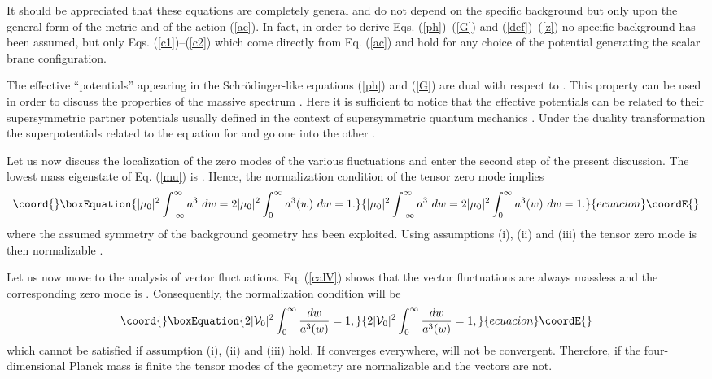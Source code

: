 \documentclass[a4paper,12pt]{article}
\begin{document}
It should be appreciated that these equations are completely general
and do not depend on the specific background but only upon the general
form of the metric and of the action (\ref{ac}). In fact, in order
to derive Eqs. (\ref{ph})--(\ref{G}) and (\ref{def})--(\ref{z}) 
no specific background has been assumed, but only Eqs. (\ref{c1})--(\ref{c2}) 
which come directly from Eq. (\ref{ac}) and hold for any choice of the 
potential generating the scalar brane configuration.

The effective ``potentials'' appearing 
in the Schr\"odinger-like equations (\ref{ph}) and (\ref{G}) are dual 
with respect to \coordHE{}. This property can be used in order to 
discuss the properties of the massive spectrum \cite{n1}. Here 
it is sufficient to notice that the effective potentials can be related 
to their supersymmetric partner potentials \cite{n1} usually 
defined in the context of supersymmetric quantum mechanics \cite{susqm}. 
Under the duality transformation \coordHE{} 
the superpotentials related to the equation for \myHighlight{$\Phi$}\coordHE{} and \coordHE{} 
go one into the other \cite{n1}. 

Let us now discuss the localization of the zero modes of the various 
fluctuations and enter the second step of the present discussion.
The lowest mass eigenstate of Eq. (\ref{mu}) 
is  \coordHE{}. Hence, the normalization 
condition of the tensor zero mode implies 
\begin{equation}\coord{}\boxEquation{
|\mu_0|^2 \int_{-\infty}^{\infty} a^3 ~dw = 2 |\mu_0|^2\int_{0}^{\infty}a^3(w)
~ dw=1 .
}{
|\mu_0|^2 \int_{-\infty}^{\infty} a^3 ~dw = 2 |\mu_0|^2\int_{0}^{\infty}a^3(w)
~ dw=1 .
}{ecuacion}\coordE{}\end{equation} 
where the assumed \coordHE{} symmetry of the background geometry 
has been exploited. Using assumptions (i), (ii) and (iii) the tensor 
zero mode is then normalizable \cite{rs,rs2}. 

Let us now move to the analysis of vector fluctuations.
 Eq. (\ref{calV}) shows that the vector fluctuations are 
always massless and the corresponding zero mode is \coordHE{}. Consequently, the normalization 
condition will be 
\begin{equation}\coord{}\boxEquation{
2 |{\cal V}_0|^2 \int_{0}^{\infty} \frac{d w}{a^3(w)} =1,
}{
2 |{\cal V}_0|^2 \int_{0}^{\infty} \frac{d w}{a^3(w)} =1,
}{ecuacion}\coordE{}\end{equation}
which cannot be satisfied if assumption (i), (ii) and (iii) hold. If \coordHE{} 
converges everywhere, \coordHE{} will not be convergent.
Therefore, if the four-dimensional Planck mass 
is finite the tensor modes of the geometry are normalizable and the vectors 
are not.
\end{document}
